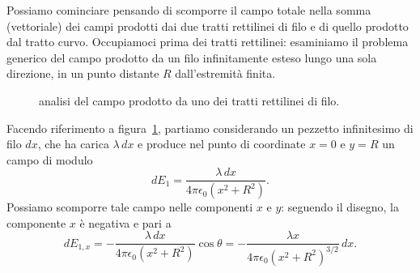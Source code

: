 \documentclass[10pt]{gulartcl}
\begin{document}
\begin{solution}
Possiamo cominciare pensando di scomporre il campo totale nella somma
(vettoriale) dei campi prodotti dai due tratti rettilinei di filo e di
quello prodotto dal tratto curvo. Occupiamoci prima dei tratti rettilinei:
esaminiamo il problema generico del campo prodotto da un filo infinitamente
esteso lungo una sola direzione, in un punto distante $R$ dall’estremità
finita.

\begin{figure}
\centering
{}
\caption{analisi del campo prodotto da uno dei tratti rettilinei di filo.}
\label{fig:thread-field}
\end{figure}

Facendo riferimento a figura~\ref{fig:thread-field}, partiamo considerando
un pezzetto infinitesimo di filo $dx$, che ha carica $\lambda\,dx$
e produce nel punto di coordinate $x = 0$ e $y = R$ un campo di modulo
\begin{equation}
    dE_1 = \frac{\lambda\, dx}{4 \pi \epsilon_0 (x^2 + R^2)}.
    \label{eq:thread-field-dd}
\end{equation}
Possiamo scomporre tale campo nelle componenti $x$ e $y$: seguendo il
disegno, la componente $x$ è negativa e pari a
\begin{equation}
    dE_{1,x} = - \frac{\lambda\, dx}{4 \pi \epsilon_0 (x^2 + R^2)}
    \cos\theta = - \frac{\lambda x}{4 \pi \epsilon_0 (x^{2} +
    R^{2})^{3/2}} \, dx.
\end{equation}


\end{solution}
\end{document}
